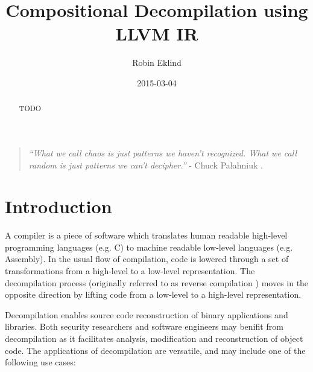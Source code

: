 \documentclass[12pt, a4paper]{article}
\title{Compositional Decompilation using LLVM IR}
\author{Robin Eklind}
\date{2015-03-04} %
\begin{document}
\maketitle

\begin{abstract}
TODO
\end{abstract}

\vfill

\begin{quote}
	\textit{``What we call chaos is just patterns we haven't recognized. What we call random is just patterns we can't decipher.''} - Chuck Palahniuk \cite{patterns_quote}.
\end{quote}

\pagebreak





\tableofcontents

\pagebreak



\section{Introduction}

A compiler is a piece of software which translates human readable high-level programming languages (e.g. C) to machine readable low-level languages (e.g. Assembly). In the usual flow of compilation, code is lowered through a set of transformations from a high-level to a low-level representation. The decompilation process (originally referred to as reverse compilation \cite{rev_comp}) moves in the opposite direction by lifting code from a low-level to a high-level representation.

Decompilation enables source code reconstruction of binary applications and libraries. Both security researchers and software engineers may benifit from decompilation as it facilitates analysis, modification and reconstruction of object code. The applications of decompilation are versatile, and may include one of the following use cases:
\end{document}
